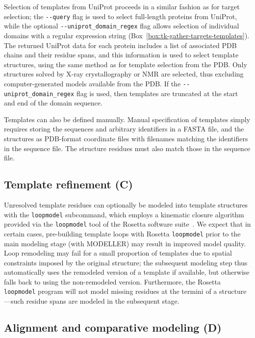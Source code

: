 \documentclass[10pt,letterpaper]{article}
\begin{document}
Selection of templates from UniProt proceeds in a similar fashion as for target selection; the {\tt -{}-query} flag is used to select full-length proteins from UniProt, while the optional {\tt -{}-uniprot\_domain\_regex} flag allows selection of individual domains with a regular expression string (Box~\ref{box:tk-gather-targets-templates}).
The returned UniProt data for each protein includes a list of associated PDB chains and their residue spans, and this information is used to select template structures, using the same method as for template selection from the PDB.
Only structures solved by X-ray crystallography or NMR are selected, thus excluding computer-generated models available from the PDB.
If the {\tt -{}-uniprot\_domain\_regex} flag is used, then templates are truncated at the start and end of the domain sequence.

Templates can also be defined manually.
Manual specification of templates simply requires storing the sequences and arbitrary identifiers in a FASTA file, and the structures as PDB-format coordinate files with filenames matching the identifiers in the sequence file.
The structure residues must also match those in the sequence file.

\subsection*{Template refinement (C)}

Unresolved template residues can optionally be modeled into template structures with the {\tt loopmodel} subcommand, which employs a kinematic closure algorithm provided via the {\tt loopmodel} tool of the Rosetta software suite~\cite{qian:nature:2007:modeller,wang:jmb:2007:modeller}.
We expect that in certain cases, pre-building template loops with Rosetta {\tt loopmodel} prior to the main modeling stage (with MODELLER) may result in improved model quality.
Loop remodeling may fail for a small proportion of templates due to spatial constraints imposed by the original structure; the subsequent modeling step thus automatically uses the remodeled version of a template if available, but otherwise falls back to using the non-remodeled version.
Furthermore, the Rosetta {\tt loopmodel} program will not model missing residues at the termini of a structure---such residue spans are modeled in the subsequent stage.

\subsection*{Alignment and comparative modeling (D)}
\end{document}
